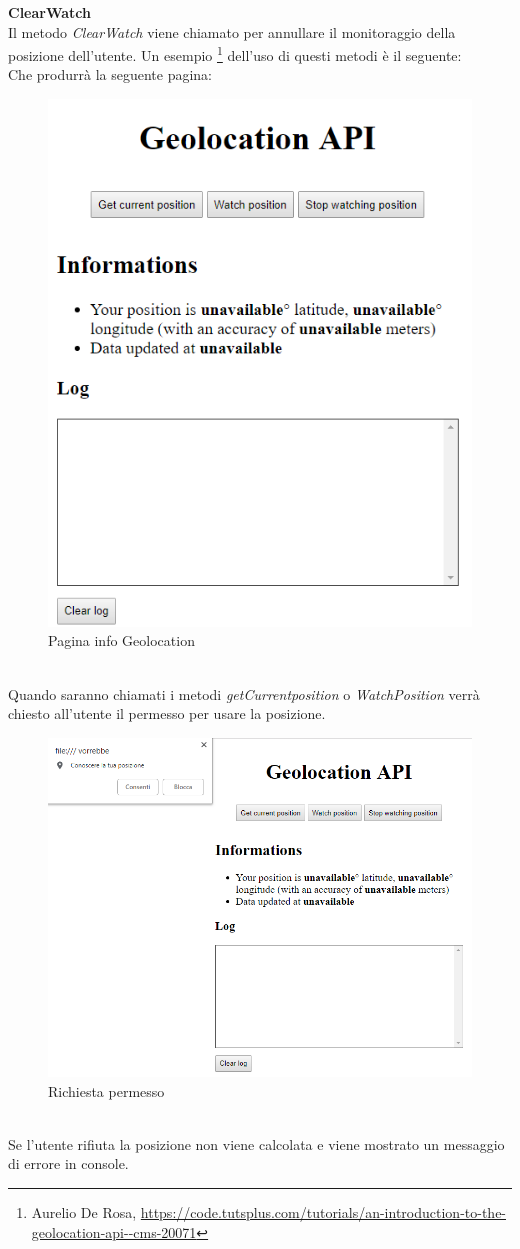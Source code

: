\documentclass[11pt ,a4paper , twoside , openright ]{book}
\begin{document}
	\textbf{ClearWatch}
	\\
	Il metodo \textit{ClearWatch} viene chiamato per annullare il monitoraggio della posizione dell'utente.
	\newpage
	Un esempio \footnote{Aurelio De Rosa, \url{https://code.tutsplus.com/tutorials/an-introduction-to-the-geolocation-api--cms-20071}} dell'uso di questi metodi è il seguente: \\
	
	Che produrrà la seguente pagina:
	\begin{figure}[h]
		\centering
		\includegraphics[width=0.5\linewidth]{geo1}
		\caption{Pagina info Geolocation}
		\label{fig: Pagina info Geolocation}
	\end{figure}
	\pagebreak
	\\
	Quando saranno chiamati i metodi \textit{getCurrentposition} o \textit{WatchPosition} verrà chiesto all'utente il permesso per usare la posizione.
	\begin{figure}[h]
		\centering
		\includegraphics[width=0.4\linewidth]{geo2}
		\caption{Richiesta permesso}
		\label{fig: Richiesta permesso}
	\end{figure}
	\\
	Se l'utente rifiuta la posizione non viene calcolata e viene mostrato un messaggio di errore in console.
\end{document}
